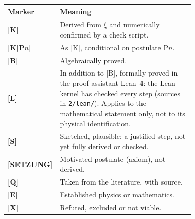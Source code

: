
\begin{center}
\small
\begin{tabular}{@{}lp{0.72\linewidth}@{}}
\toprule
\textbf{Marker} & \textbf{Meaning} \\
\midrule
\textbf{[K]} & Derived from $\xi$ and numerically confirmed by a check script. \\
\textbf{[K|P$n$]} & As [K], conditional on postulate P$n$. \\
\textbf{[B]} & Algebraically proved. \\
\textbf{[L]} & In addition to [B], formally proved in the proof assistant Lean~4: the Lean kernel has checked every step (sources in \texttt{2/lean/}). Applies to the mathematical statement only, not to its physical identification. \\
\textbf{[S]} & Sketched, plausible: a justified step, not yet fully derived or checked. \\
\textbf{[SETZUNG]} & Motivated postulate (axiom), not derived. \\
\textbf{[Q]} & Taken from the literature, with source. \\
\textbf{[E]} & Established physics or mathematics. \\
\textbf{[X]} & Refuted, excluded or not viable. \\
\bottomrule
\end{tabular}
\end{center}
